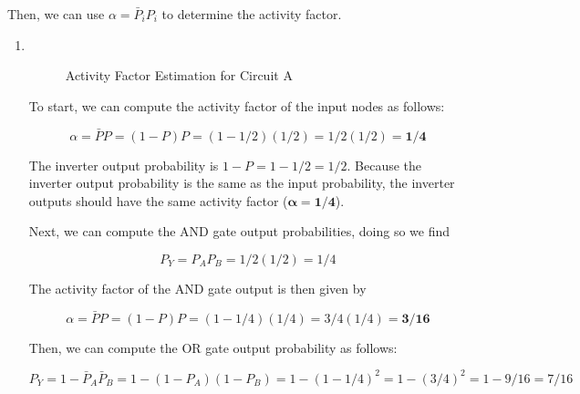 \documentclass[fleqn]{article}
\begin{document}
\begin{enumerate}
		Then, we can use $\alpha = \bar{P}_iP_i$ to determine the activity factor.
		
		\begin{enumerate}
			\item ~
			
			\begin{figure}[H]				
				\centerline{}
				\caption{Activity Factor Estimation for Circuit A}
				\label{fig::activity_factor_a}
			\end{figure}
			
			To start, we can compute the activity factor of the input nodes as follows:
			
			\begin{equation*}
				\alpha = \bar{P}P = (1 - P)P = (1 - 1/2)(1/2) = 1/2(1/2) = \mathbf{1/4}
			\end{equation*}
			
			The inverter output probability is $1 - P = 1 - 1/2 = 1/2$. Because the inverter output probability is the same as the input probability, the inverter outputs should have the same activity factor ($\mathbf{\alpha = 1/4}$).
			
			Next, we can compute the AND gate output probabilities, doing so we find
			
			\begin{equation*}
				P_Y = P_AP_B = 1/2(1/2) = 1/4
			\end{equation*}
			
			The activity factor of the AND gate output is then given by
			
			\begin{equation*}
				\alpha = \bar{P}P = (1 - P)P = (1 - 1/4)(1/4) = 3/4(1/4) = \mathbf{3/16}
			\end{equation*}
			
			Then, we can compute the OR gate output probability as follows:
			
			\begin{equation*}
				P_Y = 1 - \bar{P}_A\bar{P}_B = 1 - (1 - P_A)(1 - P_B) = 1 - (1 - 1/4)^2 = 1 - (3/4)^2 = 1 - 9/16 = 7/16
			\end{equation*}
			

\end{enumerate}
\end{enumerate}
\end{document}
